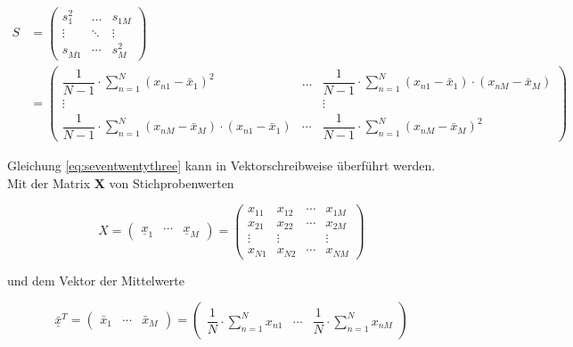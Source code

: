 \begin{equation}\label{eq:seventwentythree}
\begin{split}
S & = \left(\begin{array}{ccc} {s_{1}^{2} } & {\ldots } & {s_{1M}^{} } \\ {\vdots } & {\ddots } & {\vdots } \\ {s_{M1}^{} } & {\cdots } & {s_{M}^{2} } \end{array}\right) \\ 
& = \left(\begin{array}{ccc} {\dfrac{1}{N-1} \cdot \sum\limits _{n=1}^{N}\left(x_{n1} -\bar{x}_{1} \right)^{2}  } & {\ldots } & {\dfrac{1}{N-1} \cdot \sum\limits _{n=1}^{N}\left(x_{n1} -\bar{x}_{1} \right)\cdot \left(x_{nM} -\bar{x}_{M} \right) } \\ {\vdots } & {} & {\vdots } \\ {\dfrac{1}{N-1} \cdot \sum\limits _{n=1}^{N}\left(x_{nM} -\bar{x}_{M} \right)\cdot \left(x_{n1} -\bar{x}_{1} \right) } & {\cdots } & {\dfrac{1}{N-1} \cdot \sum\limits _{n=1}^{N}\left(x_{nM} -\bar{x}_{M} \right)^{2}} \end{array}\right)
\end{split}
\end{equation}

\noindent Gleichung \eqref{eq:seventwentythree} kann in Vektorschreibweise \"{u}berf\"{u}hrt werden. Mit der Matrix \textbf{X} von Stichprobenwerten

\begin{equation}\label{eq:seventwentyfour}
X=\left(\begin{array}{ccc} {\underline{x}_{1} } & {\cdots } & {\underline{x}_{M} } \end{array}\right)=\left(\begin{array}{cccc} {x_{11} } & {x_{12} } & {\cdots } & {x_{1M} } \\ {x_{21} } & {x_{22} } & {\cdots } & {x_{2M} } \\ {\vdots } & {\vdots } & {} & {\vdots } \\ {x_{N1} } & {x_{N2} } & {\cdots } & {x_{NM} } \end{array}\right)
\end{equation}

\noindent und dem Vektor der Mittelwerte 

\begin{equation}\label{eq:seventwentyfive}
\underline{\bar{x}}^{T} =\left(\begin{array}{ccc} {\bar{x}_{1} } & {\cdots } & {\bar{x}_{M} } \end{array}\right)=\left(\begin{array}{ccc} {\dfrac{1}{N} \cdot \sum\limits _{n=1}^{N}x_{n1}  } & {\cdots } & {\dfrac{1}{N} \cdot \sum\limits _{n=1}^{N}x_{nM}  } \end{array}\right)
\end{equation}

